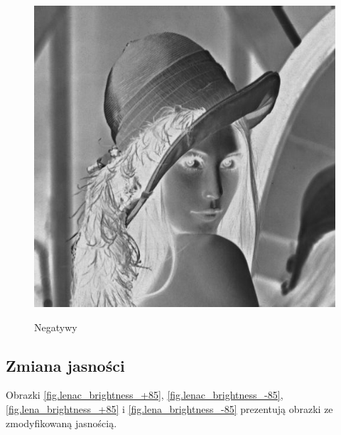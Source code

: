 \documentclass{classrep}
\begin{document}
\begin{figure}
{  \includegraphics[scale=0.5]{img/lena_negative.png}
  \label{fig.lena_negative}
 }
\caption{Negatywy}
\end{figure}

\subsection{Zmiana jasności}
Obrazki \ref{fig.lenac_brightness_+85}, \ref{fig.lenac_brightness_-85}, \ref{fig.lena_brightness_+85} i \ref{fig.lena_brightness_-85} prezentują obrazki ze zmodyfikowaną jasnością.
\end{document}
